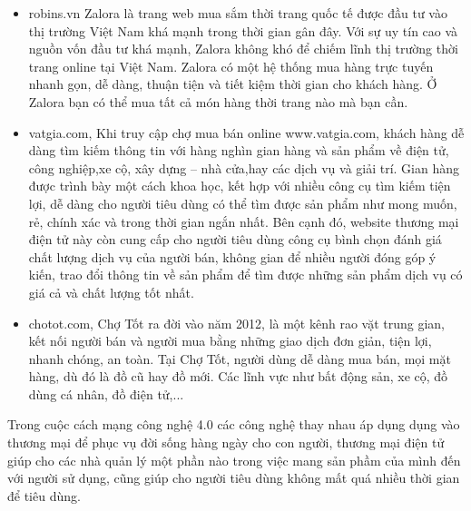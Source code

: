 \begin{itemize}
\item robins.vn Zalora là trang web mua sắm thời trang quốc tế được đầu tư vào thị trường Việt Nam khá mạnh trong thời gian gân đây. Với sự uy tín cao và nguồn vốn đầu tư khá mạnh, Zalora không khó để chiếm lĩnh thị trường thời trang online tại Việt Nam. Zalora có một hệ thống mua hàng trực tuyến nhanh gọn, dễ dàng, thuận tiện và tiết kiệm thời gian cho khách hàng. Ở Zalora bạn có thể mua tất cả món hàng thời trang nào mà bạn cần.
\item vatgia.com, Khi truy cập chợ mua bán online www.vatgia.com, khách hàng dễ dàng tìm kiếm thông tin với hàng nghìn gian hàng và sản phẩm về điện tử, công nghiệp,xe cộ, xây dựng – nhà cửa,hay các dịch vụ và giải trí. Gian hàng được trình bày một cách khoa học, kết hợp với nhiều công cụ tìm kiếm tiện lợi, dễ dàng cho người tiêu dùng có thể tìm được sản phẩm như mong muốn, rẻ, chính xác và trong thời gian ngắn nhất. Bên cạnh đó, website thương mại điện tử này còn cung cấp cho người tiêu dùng công cụ bình chọn đánh giá chất lượng dịch vụ của người bán, không gian để nhiều người đóng góp ý kiến, trao đổi thông tin về sản phẩm để tìm được những sản phẩm dịch vụ có giá cả và chất lượng tốt nhất.
\item chotot.com, Chợ Tốt ra đời vào năm 2012, là một kênh rao vặt trung gian, kết nối người bán và người mua bằng những giao dịch đơn giản, tiện lợi, nhanh chóng, an toàn. Tại Chợ Tốt, người dùng dễ dàng mua bán, mọi mặt hàng, dù đó là đồ cũ hay đồ mới. Các lĩnh vực như bất động sản, xe cộ, đồ dùng cá nhân, đồ điện tử,...\cite{1}
\end{itemize}
\par
Trong cuộc cách mạng công nghệ 4.0 các công nghệ thay nhau áp dụng dụng vào thương mại để phục vụ đời sống hàng ngày cho con người, thương mại điện tử giúp cho các nhà quản lý một phần nào trong việc mang sản phầm của mình đến với người sử dụng, cũng giúp cho người tiêu dùng không mất quá nhiều thời gian để tiêu dùng.
